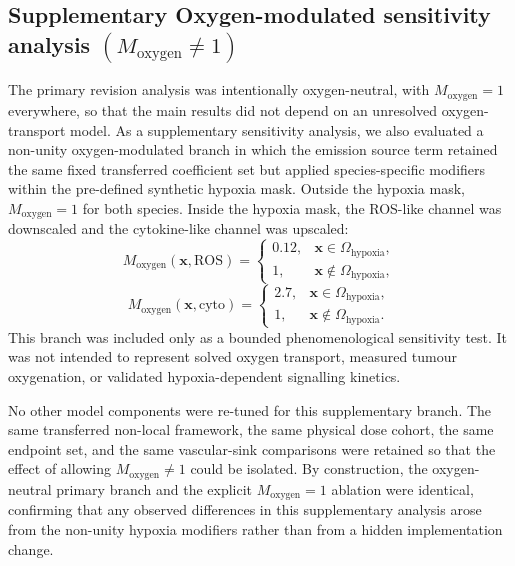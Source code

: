\documentclass[10pt,a4paper]{article}
\begin{document}
\subsection{Supplementary Oxygen-modulated sensitivity analysis \texorpdfstring{$(M_{\mathrm{oxygen}}\neq 1)$}{(Moxygen not equal 1)}}

The primary revision analysis was intentionally oxygen-neutral, with $M_{\mathrm{oxygen}}=1$ everywhere, so that the main results did not depend on an unresolved oxygen-transport model. As a supplementary sensitivity analysis, we also evaluated a non-unity oxygen-modulated branch in which the emission source term retained the same fixed transferred coefficient set but applied species-specific modifiers within the pre-defined synthetic hypoxia mask. Outside the hypoxia mask, $M_{\mathrm{oxygen}}=1$ for both species. Inside the hypoxia mask, the ROS-like channel was downscaled and the cytokine-like channel was upscaled:
\begin{equation}
M_{\mathrm{oxygen}}(\mathbf{x},\mathrm{ROS}) =
\begin{cases}
0.12, & \mathbf{x}\in\Omega_{\mathrm{hypoxia}},\\
1, & \mathbf{x}\notin\Omega_{\mathrm{hypoxia}},
\end{cases}
\end{equation}
\begin{equation}
M_{\mathrm{oxygen}}(\mathbf{x},\mathrm{cyto}) =
\begin{cases}
2.7, & \mathbf{x}\in\Omega_{\mathrm{hypoxia}},\\
1, & \mathbf{x}\notin\Omega_{\mathrm{hypoxia}}.
\end{cases}
\end{equation}
This branch was included only as a bounded phenomenological sensitivity test. It was not intended to represent solved oxygen transport, measured tumour oxygenation, or validated hypoxia-dependent signalling kinetics.

No other model components were re-tuned for this supplementary branch. The same transferred non-local framework, the same physical dose cohort, the same endpoint set, and the same vascular-sink comparisons were retained so that the effect of allowing $M_{\mathrm{oxygen}}\neq 1$ could be isolated. By construction, the oxygen-neutral primary branch and the explicit $M_{\mathrm{oxygen}}=1$ ablation were identical, confirming that any observed differences in this supplementary analysis arose from the non-unity hypoxia modifiers rather than from a hidden implementation change.
\end{document}
